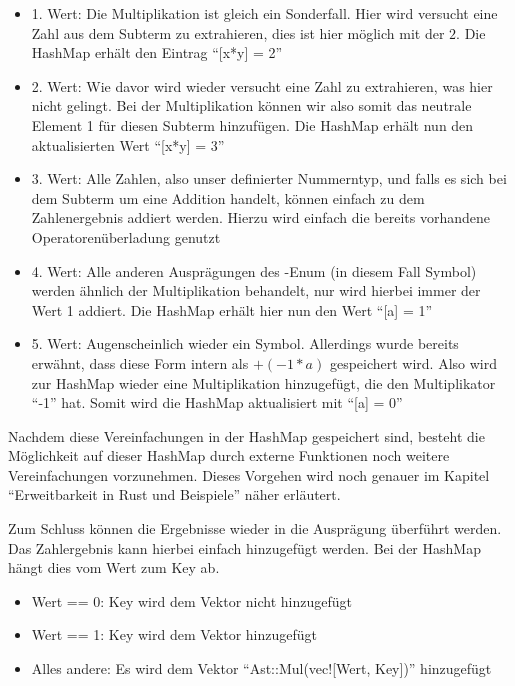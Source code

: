 \documentclass[11pt,a4paper, ngerman]{article}
\begin{document}
\begin{itemize}
    \item 1. Wert: Die Multiplikation ist gleich ein Sonderfall. Hier wird versucht eine Zahl aus dem Subterm zu extrahieren, dies ist hier möglich mit der $2$. Die HashMap erhält den Eintrag ``[x*y] = 2''
    \item 2. Wert: Wie davor wird wieder versucht eine Zahl zu extrahieren, was hier nicht gelingt. Bei der Multiplikation können wir also somit das neutrale Element 1 für diesen Subterm hinzufügen. Die HashMap erhält nun den aktualisierten Wert ``[x*y] = 3''
    \item 3. Wert: Alle Zahlen, also unser definierter Nummerntyp, und falls es sich bei dem Subterm um eine Addition handelt, können einfach zu dem Zahlenergebnis addiert werden. Hierzu wird einfach die bereits vorhandene Operatorenüberladung genutzt
    \item 4. Wert: Alle anderen Ausprägungen des -Enum (in diesem Fall Symbol) werden ähnlich der Multiplikation behandelt, nur wird hierbei immer der Wert 1 addiert. Die HashMap erhält hier nun den Wert ``[a] = 1''
    \item 5. Wert: Augenscheinlich wieder ein Symbol. Allerdings wurde bereits erwähnt, dass diese Form intern als $+(-1*a)$ gespeichert wird. Also wird zur HashMap wieder eine Multiplikation hinzugefügt, die den Multiplikator ``-1'' hat. Somit wird die HashMap aktualisiert mit ``[a] = 0''
\end{itemize}

Nachdem diese Vereinfachungen in der HashMap gespeichert sind, besteht die Möglichkeit auf dieser HashMap durch externe Funktionen noch weitere Vereinfachungen vorzunehmen. Dieses Vorgehen wird noch genauer im Kapitel ``Erweitbarkeit in Rust und Beispiele'' näher erläutert.

Zum Schluss können die Ergebnisse wieder in die Ausprägung  überführt werden. Das Zahlergebnis kann hierbei einfach hinzugefügt werden. Bei der HashMap hängt dies vom Wert zum Key ab. 

\begin{itemize}
    \item Wert == 0: Key wird dem Vektor nicht hinzugefügt
    \item Wert == 1: Key wird dem Vektor hinzugefügt
    \item Alles andere: Es wird dem Vektor ``Ast::Mul(vec![Wert, Key])'' hinzugefügt
\end{itemize}
\end{document}
